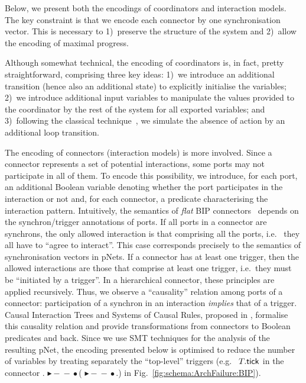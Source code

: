 \documentclass{llncs}
\newcommand{\newCoord}[1]{{\color{blue}#1}}
\newcommand{\fig}[1]{Fig.~\ref{fig:#1}}
\newcommand{\ie}[1][\ ]{i.e.#1}
\newcommand{\eg}[1][\ ]{e.g.#1}
\newcommand{\trigsynch}{%
  \mbox{\ensuremath{\blacktriangleright\!\!\!-\!\!\!-\!\!\!\bullet}}}
\begin{document}
\newCoord{Below, we present both the encodings of coordinators and
  interaction models.  The key constraint is that we encode each
  connector by one synchronisation vector.  This is necessary to
  1)~preserve the structure of the system and 2)~allow the encoding of
  maximal progress.

  Although somewhat technical, the encoding of coordinators is, in
  fact, pretty straightforward, comprising three key ideas: 1)~we
  introduce an additional transition (hence also an additional state)
  to explicitly initialise the variables; 2)~we introduce additional
  input variables to manipulate the values provided to the coordinator
  by the rest of the system for all exported variables; and
  3)~following the classical technique~\cite{milner83-calculi}, we
  simulate the absence of action by an additional loop transition.

  The encoding of connectors (interaction models) is more involved.
  Since a connector represents a set of potential interactions, some
  ports may not participate in all of them.  To encode this
  possibility, we introduce, for each port, an additional Boolean
  variable denoting whether the port participates in the interaction
  or not and, for each connector, a predicate characterising the
  interaction pattern.  Intuitively, the semantics of \emph{flat} BIP
  connectors~\cite{BliSif08-acp-tc} depends on the synchron/trigger
  annotations of ports.  If all ports in a connector are synchrons,
  the only allowed interaction is that comprising all the ports, \ie
  they all have to ``agree to interact''.  This case corresponds
  precisely to the semantics of synchronisation vectors in pNets.  If
  a connector has at least one trigger, then the allowed interactions
  are those that comprise at least one trigger, \ie they must be
  ``initiated by a trigger''.  In a hierarchical connector, these
  principles are applied recursively.  Thus, we observe a
  ``causality'' relation among ports of a connector: participation of
  a synchron in an interaction \emph{implies} that of a trigger.
  Causal Interaction Trees and Systems of Causal Rules, proposed in
  \cite{BliSif10-causal-fmsd}, formalise this causality relation and
  provide transformations from connectors to Boolean predicates and
  back.  Since we use SMT techniques for the analysis of the resulting
  pNet, the encoding presented below is optimised to reduce the number
  of variables by treating separately the ``top-level'' triggers (\eg
  $T.\mathsf{tick}$ in the connector {\NameTimer.\PortTick
    \trigsynch (\PortFail \trigsynch \NameCtrl.\PortFail)} in
  \fig{schema:ArchFailure:BIP}).
%
}
\end{document}
